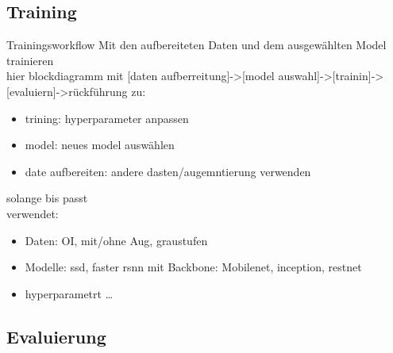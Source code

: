 \subsection[\thesection .\thesubsection \ 
Training]{Training}\label{subsec:train}
\begin{frame}{Trainingsworkflow}
    Mit den aufbereiteten Daten und dem ausgewählten Model trainieren
    \\
    hier blockdiagramm mit [daten aufberreitung]->[model auswahl]->[trainin]->[evaluiern]->rückführung zu:
    \begin{itemize}
        \item trining: hyperparameter anpassen
        \item model: neues model auswählen
        \item date aufbereiten: andere dasten/augemntierung verwenden
    \end{itemize}
    solange bis passt
    \\
    verwendet:
    \begin{itemize}
        \item Daten: OI, mit/ohne Aug, graustufen
        \item Modelle: ssd, faster rsnn mit Backbone: Mobilenet, inception, restnet
        \item hyperparametrt \dots
    \end{itemize}
\end{frame}


\subsection[\thesection .\thesubsection \ 
Evaluierung]{Evaluierung}\label{subsec:eval}

